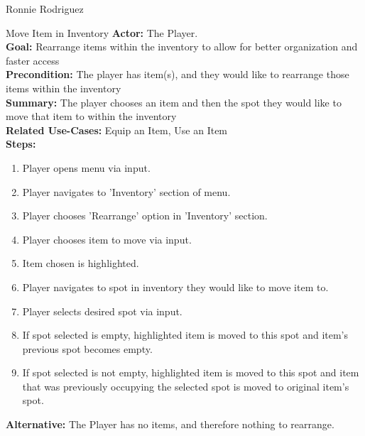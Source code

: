 \documentclass[12pt]{report}
\begin{document}
\begin{section}{Ronnie Rodriguez}
\begin{subsection}{Move Item in Inventory}
\textbf{Actor:} The Player. \\
\textbf{Goal:} Rearrange items within the inventory to allow for better organization and faster access \\
\textbf{Precondition:} The player has item(s), and they would like to rearrange those items within the inventory \\
\textbf{Summary:} The player chooses an item and then the spot they would like to move that item to within the inventory \\
\textbf{Related Use-Cases:} Equip an Item, Use an Item \\
\textbf{Steps:}
\begin{enumerate}
	\item Player opens menu via input.
	\item Player navigates to 'Inventory' section of menu.
	\item Player chooses 'Rearrange' option in 'Inventory' section.
	\item Player chooses item to move via input.
	\item Item chosen is highlighted.
	\item Player navigates to spot in inventory they would like to move item to.
	\item Player selects desired spot via input.
	\item If spot selected is empty, highlighted item is moved to this spot and item's previous spot becomes empty.
	\item If spot selected is not empty, highlighted item is moved to this spot and item that was previously occupying the selected spot is moved to original item's spot.
\end{enumerate}
\textbf{Alternative:} The Player has no items, and therefore nothing to rearrange.
\end{subsection}
\end{section}
\end{document}
